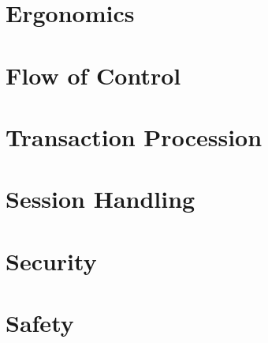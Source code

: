 \section{Ergonomics}
\label{sec:Ergonomics}


\section{Flow of Control}
\label{sec:Flow of Control}


\section{Transaction Procession}
\label{sec:Transaction Procession}


\section{Session Handling}
\label{sec:Session Handling}


\section{Security}
\label{sec:Security}


\section{Safety}
\label{sec:Safety}

